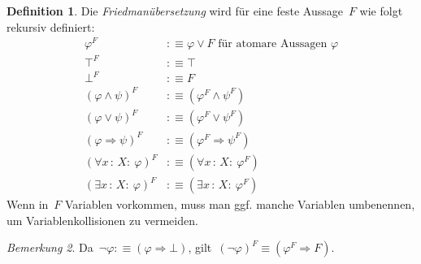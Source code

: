 \documentclass[a4paper,ngerman,12pt]{scrartcl}
\theoremstyle{definition}
\newtheorem{defn}{Definition}[section]
\theoremstyle{plain}
\theoremstyle{remark}
\newtheorem{bem}[defn]{Bemerkung}
\renewcommand{\_}{\mathpunct{.}\,}
\newcommand{\?}{\,{:}\,}
\begin{document}
\begin{defn}Die \emph{Friedmanübersetzung}
wird für eine feste Aussage~$F$ wie folgt rekursiv definiert:
\begin{align*}
  \varphi^F &:\equiv \varphi \vee F \text{ für atomare Aussagen~$\varphi$} \\
  \top^F &:\equiv \top \\
  \bot^F &:\equiv F \\
  (\varphi \wedge \psi)^F &:\equiv (\varphi^F \wedge \psi^F) \\
  (\varphi \vee \psi)^F &:\equiv (\varphi^F \vee \psi^F) \\
  (\varphi \Rightarrow \psi)^F &:\equiv (\varphi^F \Rightarrow \psi^F) \\
  (\forall x\?X{:}\ \varphi)^F &:\equiv (\forall x\?X{:}\ \varphi^F) \\
  (\exists x\?X{:}\ \varphi)^F &:\equiv (\exists x\?X{:}\ \varphi^F)
\end{align*}
Wenn in~$F$ Variablen vorkommen, muss man ggf. manche Variablen umbenennen, um
Variablenkollisionen zu vermeiden.
\end{defn}

\begin{bem}Da~$\neg\varphi :\equiv (\varphi \Rightarrow \bot)$,
gilt~$(\neg\varphi)^F \equiv (\varphi^F \Rightarrow F)$.\end{bem}
\end{document}
